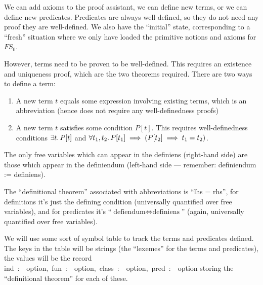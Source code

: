 \begin{node}
We can add axioms to the proof assistant, we can define new terms, or
we can define new predicates. Predicates are always well-defined, so
they do not need any proof they are well-defined. We also have the
``initial'' state, corresponding to a ``fresh'' situation where we
only have loaded the primitive notions and axioms for $FS_{0}$.

However, terms need to be proven to be well-defined. This requires an
existence and uniqueness proof, which are the two theorems
required. There are two ways to define a term:
\begin{enumerate}
\item A new term $t$ equals some expression involving existing terms,
  which is an abbreviation (hence does not require any
  well-definedness proofs)
\item A new term $t$ satisfies some condition $P[t]$. This requires
  well-definedness conditions $\exists t\ldotp P[t]$ and
  $\forall t_{1},t_{2}\ldotp P[t_{1}]\implies(P[t_{2}]\implies t_{1}=t_{2})$.
\end{enumerate}
The only free variables which can appear in the definiens (right-hand side) are those
which appear in the definiendum (left-hand side --- remember:
definiendum := definiens).

The ``definitional theorem'' associated with abbreviations is ``lhs = rhs'',
for definitions it's just the defining condition (universally
quantified over free variables), and for predicates it's
``$\mbox{defiendum}\iff\mbox{definiens}$'' (again, universally
quantified over free variables).
\end{node}

\begin{node}
We will use some sort of symbol table to track the terms and
predicates defined. The keys in the table will be strings (the
``lexemes'' for the terms and predicates), the values will be the
record {\Tt{}{\nwlbrace}ind\ :\ \ option,\ fun\ :\ \ option,\ class\ :\ \ option,\ pred\ :\ \ option{\nwrbrace}\nwendquote}
storing the ``definitional theorem'' for each of these.
\end{node}

